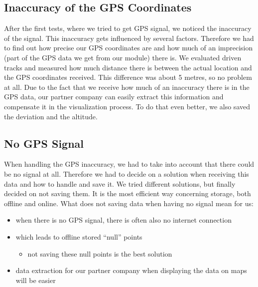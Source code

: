 \subsection{Inaccuracy of the GPS Coordinates}
After the first tests, where we tried to get GPS signal, we noticed the inaccuracy of the signal. This inaccuracy gets influenced by several factors. Therefore we had to find out how precise our GPS coordinates are and how much of an imprecision (part of the GPS data we get from our module) there is. 
\newline \newline
We evaluated driven tracks and measured how much distance there is between the actual location and the GPS coordinates received. This difference was about 5 metres, so no problem at all. 
\newline \newline
Due to the fact that we receive how much of an inaccuracy there is in the GPS data, our partner company can easily extract this information and compensate it in the visualization process. To do that even better, we also saved the deviation and the altitude.

\begin{center}
\end{center}

\subsection{No GPS Signal}
When handling the GPS inaccuracy, we had to take into account that there could be no signal at all. Therefore we had to decide on a solution when receiving this data and how to handle and save it.
\newline \newline
We tried different solutions, but finally decided on not saving them. It is the most efficient way concerning storage, both offline and online.
\newline \newline
What does not saving data when having no signal mean for us:
\begin{itemize}
\item when there is no GPS signal, there is often also no internet connection
\item which leads to offline stored “null” points
	\begin{itemize}
	\item not saving these null points is the best solution
	\end{itemize}		
\item data extraction for our partner company when displaying the data on maps will be easier
\end{itemize}